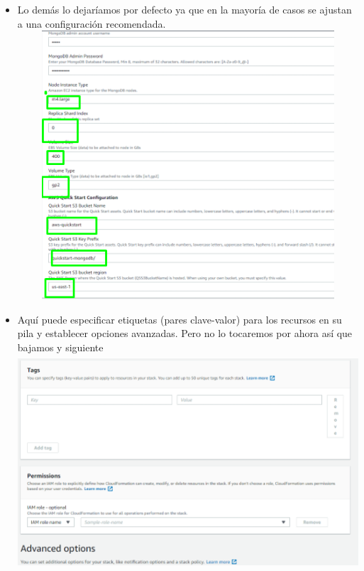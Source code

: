 \documentclass[12pt,a4paper,oneside]{book}
\begin{document}
\newpage
\begin{itemize}
	\item {Lo demás lo dejaríamos por defecto ya que en la mayoría de casos se ajustan a una configuración recomendada.}\\
	
	\includegraphics[width=16cm, height=10cm]{img/14.png}\\
	
	\item {Aquí puede especificar etiquetas (pares clave-valor) para los recursos en su pila y establecer opciones avanzadas. Pero no lo tocaremos por ahora así que bajamos y siguiente}\\
	
	\includegraphics[width=16cm, height=8cm]{img/15.png}\\
	
	
	
\end{itemize}
\end{document}

